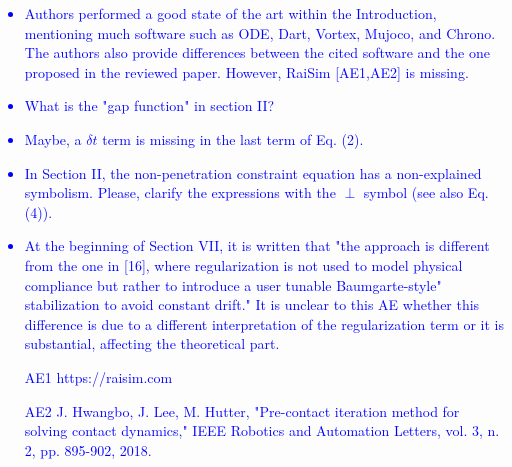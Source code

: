 \textcolor{blue}{
\begin{itemize}
    \item Authors performed a good state of the art within the Introduction,
    mentioning much software such as ODE, Dart, Vortex, Mujoco, and Chrono. The
    authors also provide differences between the cited software and the one
    proposed in the reviewed paper. However, RaiSim [AE1,AE2] is
    missing.\end{itemize}}

\textcolor{blue}{
\begin{itemize}
    \item What is the "gap function" in section II?\end{itemize}}
    
\textcolor{blue}{\begin{itemize}
\item Maybe, a $\delta t$ term is missing in the last term of Eq. (2).
\end{itemize}} 

\textcolor{blue}{\begin{itemize}
\item In Section II, the non-penetration constraint equation has a non-explained
symbolism. Please, clarify the expressions with the $\perp$ symbol (see also Eq.
(4)).\end{itemize}} 
    
\textcolor{blue}{\begin{itemize}
\item At the beginning of Section VII, it is written that "the approach is
different from the one in [16], where regularization is not used to model
physical compliance but rather to introduce a user tunable Baumgarte-style"
stabilization to avoid constant drift." It is unclear to this AE whether this
difference is due to a different interpretation of the regularization term or it
is substantial, affecting the theoretical part.\end{itemize}} 

\vspace{5mm}
\textcolor{blue}{\begin{itemize}
    \item[AE1] https://raisim.com
    \item[AE2] J. Hwangbo, J. Lee, M. Hutter, "Pre-contact iteration method for
solving contact dynamics," IEEE Robotics and Automation Letters, vol. 3, n. 2,
pp. 895-902, 2018.\end{itemize}} 

